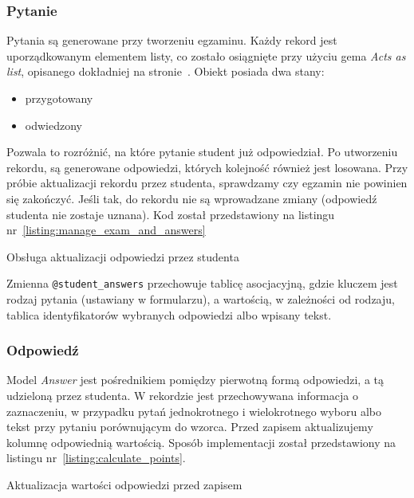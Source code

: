 \documentclass[a4paper,12pt]{article}
\begin{document}
\subsubsection{Pytanie}
Pytania są generowane przy tworzeniu egzaminu. Każdy rekord jest uporządkowanym elementem
listy, co zostało osiągnięte przy użyciu gema \emph{Acts as list}, opisanego dokładniej na
stronie~\pageref{sec:acts_as_list}. Obiekt posiada dwa stany:

\begin{itemize}
  \item{przygotowany}
  \item{odwiedzony}
\end{itemize}


Pozwala to rozróżnić, na które pytanie student już odpowiedział. Po utworzeniu rekordu, są
generowane odpowiedzi, których kolejność również jest losowana. Przy próbie aktualizacji
rekordu przez studenta, sprawdzamy czy egzamin nie powinien się zakończyć. Jeśli tak,
do rekordu nie są wprowadzane zmiany (odpowiedź studenta nie zostaje uznana). Kod został
przedstawiony na listingu nr~\ref{listing:manage_exam_and_answers}

\begin{listing}
  
  \caption{Obsługa aktualizacji odpowiedzi przez studenta}
  \label{listing:manage_exam_and_answers}
\end{listing}


Zmienna \texttt{@student\_answers} przechowuje tablicę asocjacyjną, gdzie kluczem jest
rodzaj pytania (ustawiany w formularzu), a wartością, w zależności od rodzaju,
tablica identyfikatorów wybranych odpowiedzi albo wpisany tekst.

\subsubsection{Odpowiedź}
Model \emph{Answer} jest pośrednikiem pomiędzy pierwotną formą odpowiedzi, a tą udzieloną
przez studenta. W rekordzie jest przechowywana informacja o zaznaczeniu, w przypadku pytań
jednokrotnego i wielokrotnego wyboru albo tekst przy pytaniu porównującym do wzorca. Przed
zapisem aktualizujemy kolumnę odpowiednią wartością. Sposób implementacji został
przedstawiony na listingu nr~\ref{listing:calculate_points}.

\begin{listing}
  
  \caption{Aktualizacja wartości odpowiedzi przed zapisem}
  \label{listing:calculate_points}
\end{listing}
\end{document}
